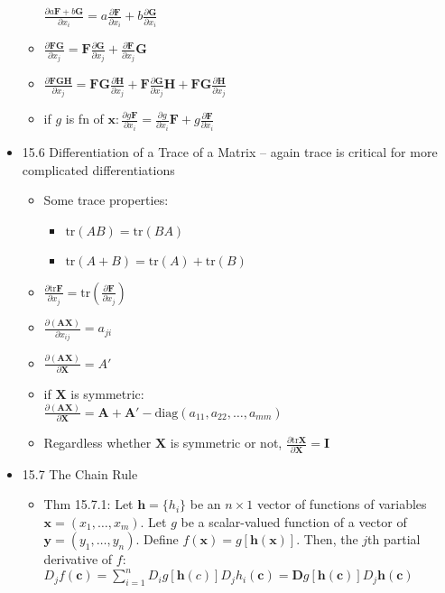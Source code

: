\documentclass[a4paper]{article}
\newcommand{\cg}{\color{gray}}
\newcommand{\tr}{\text{tr}}
\newcommand{\diag}{\text{diag}}
\newcommand{\mb}{\mathbf}
\begin{document}
\begin{itemize}
\begin{itemize}
$\frac{\partial a\mb{F}+b\mb{G}}{\partial x_i} = a\frac{\partial \mb{F}}{\partial x_i}+b\frac{\partial \mb{G}}{\partial x_i}$
\item $\frac{\partial \mb{FG}}{\partial x_j} = \mb{F}\frac{\partial \mb{G}}{\partial x_j}+\frac{\partial \mb{F}}{\partial x_j}\mb{G}$
\item $\frac{\partial \mb{FGH}}{\partial x_j} = \mb{FG}\frac{\partial \mb{H}}{\partial x_j}+\mb{F}\frac{\partial \mb{G}}{\partial x_j}\mb{H}+\mb{FG}\frac{\partial \mb{H}}{\partial x_j}$
\item if $g$ is fn of $\mathbf{x}: \frac{\partial g\mb{F}}{\partial x_i} = \frac{\partial g}{\partial x_i}\mb{F}+g\frac{\partial \mb{F}}{\partial x_i}$
\end{itemize}
\item 15.6 Differentiation of a Trace of a Matrix {\cg -- again trace is critical for more complicated differentiations}
\begin{itemize}
\item Some trace properties:
\begin{itemize}
\item $\tr(AB)=\tr(BA)$
\item $\tr(A+B)=\tr(A)+\tr(B)$
\end{itemize}
\item $\frac{\partial \tr{\mb{F}}}{\partial x_j} = \tr\left(\frac{\partial\mb{F}}{\partial x_j}\right)$
\item $\frac{\partial (\mb{AX})}{\partial x_{ij}}=a_{ji}$
\item $\frac{\partial (\mb{AX})}{\partial \mb{X}}=A'$
\item if $\mb{X}$ is symmetric:\\
$\frac{\partial (\mb{AX})}{\partial \mb{X}}=\mb{A}+\mb{A}'-\diag(a_{11},a_{22}, \hdots, a_{mm})$ \\
\item Regardless whether $\mb{X}$ is symmetric or not, $\frac{\partial \tr{\mb{X}}}{\partial \mb{X}} = \mb{I}$
\end{itemize}
\item 15.7 The Chain Rule
\begin{itemize}
\item Thm 15.7.1: Let $\mb{h} = \{h_i\}$ be an $n\times 1$ vector of functions of variables $\mb{x}=(x_1,\hdots,x_m)$. Let $g$ be a scalar-valued function of a vector of $\mb{y}=(y_1,\hdots,y_n)$. Define $f(\mb{x}) = g[\mb{h(x)}]$. Then, the $j$th partial derivative of $f$: \\
 $D_j f(\mb{c}) = \sum_{i=1}^n D_i g[\mb{h}(c)]D_j h_i(\mb{c}) = \mb{D}g[\mb{h(c)}]D_j\mb{h(c)}$

\end{itemize}
\end{itemize}
\end{document}
